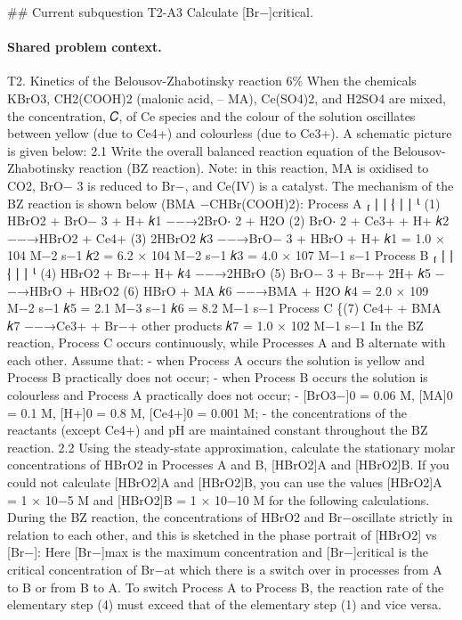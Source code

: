 \#\# Current subquestion T2-A3
Calculate [Br−]critical.

\paragraph{Shared problem context.}
T2. Kinetics of the Belousov-Zhabotinsky reaction 6\% When the chemicals KBrO3, CH2(COOH)2 (malonic acid, – MA), Ce(SO4)2, and H2SO4 are mixed, the concentration, 𝐶, of Ce species and the colour of the solution oscillates between yellow (due to Ce4+) and colourless (due to Ce3+). A schematic picture is given below: 2.1 Write the overall balanced reaction equation of the Belousov-Zhabotinsky reaction (BZ reaction). Note: in this reaction, MA is oxidised to CO2, BrO− 3 is reduced to Br−, and Ce(IV) is a catalyst. The mechanism of the BZ reaction is shown below (BMA −CHBr(COOH)2): Process A ⎧ ⎪ ⎪ ⎨ ⎪ ⎪ ⎩ (1) HBrO2 + BrO− 3 + H+ 𝑘1 −−→2BrO⋅ 2 + H2O (2) BrO⋅ 2 + Ce3+ + H+ 𝑘2 −−→HBrO2 + Ce4+ (3) 2HBrO2 𝑘3 −−→BrO− 3 + HBrO + H+ 𝑘1 = 1.0 × 104 M−2 s−1 𝑘2 = 6.2 × 104 M−2 s−1 𝑘3 = 4.0 × 107 M−1 s−1 Process B ⎧ ⎪ ⎪ ⎨ ⎪ ⎪ ⎩ (4) HBrO2 + Br−+ H+ 𝑘4 −−→2HBrO (5) BrO− 3 + Br−+ 2H+ 𝑘5 −−→HBrO + HBrO2 (6) HBrO + MA 𝑘6 −−→BMA + H2O 𝑘4 = 2.0 × 109 M−2 s−1 𝑘5 = 2.1 M−3 s−1 𝑘6 = 8.2 M−1 s−1 Process C \{(7) Ce4+ + BMA 𝑘7 −−→Ce3+ + Br−+ other products 𝑘7 = 1.0 × 102 M−1 s−1 In the BZ reaction, Process C occurs continuously, while Processes A and B alternate with each other. Assume that: - when Process A occurs the solution is yellow and Process B practically does not occur; - when Process B occurs the solution is colourless and Process A practically does not occur; - [BrO3−]0 = 0.06 M, [MA]0 = 0.1 M, [H+]0 = 0.8 M, [Ce4+]0 = 0.001 M; - the concentrations of the reactants (except Ce4+) and pH are maintained constant throughout the BZ reaction. 2.2 Using the steady-state approximation, calculate the stationary molar concentrations of HBrO2 in Processes A and B, [HBrO2]A and [HBrO2]B. If you could not calculate [HBrO2]A and [HBrO2]B, you can use the values [HBrO2]A = 1 × 10−5 M and [HBrO2]B = 1 × 10−10 M for the following calculations. During the BZ reaction, the concentrations of HBrO2 and Br−oscillate strictly in relation to each other, and this is sketched in the phase portrait of [HBrO2] vs [Br−]: Here [Br−]max is the maximum concentration and [Br−]critical is the critical concentration of Br−at which there is a switch over in processes from A to B or from B to A. To switch Process A to Process B, the reaction rate of the elementary step (4) must exceed that of the elementary step (1) and vice versa.

